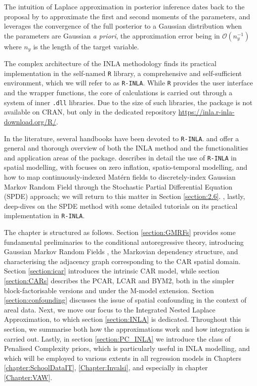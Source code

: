 \documentclass[openany, 11pt, oneside]{book}
\begin{document}
The intuition of Laplace approximation in posterior inference dates back to the proposal by \cite{tierney1986accurate} to approximate the first and second moments of the parameters, and leverages the convergence of the full posterior to a Gaussian distribution when the parameters are Gaussian \textit{a priori}, the approximation error being in $\mathcal{O}(n_y^{-1})$ where $n_y$ is the length of the target variable. 

The complex architecture of the INLA methodology finds its practical implementation in the self-named \texttt{R} library, a comprehensive and self-sufficient environment, which we will refer to as \texttt{R-INLA}. While \texttt{R} provides the user interface and the wrapper functions, the core of calculations is carried out through a system of inner \texttt{.dll} libraries. Due to the size of such libraries, the package is not available on CRAN, but only in the dedicated repository \url{https://inla.r-inla-download.org/R/}.

In the literature, several handbooks have been devoted to \texttt{R-INLA}. \cite{Wang} and \cite{INLAbook} offer a general and thorough overview of both the INLA method and the functionalities and application areas of the package. \cite{Blangiardo} describes in detail the use of \texttt{R-INLA} in spatial modelling, with focuses on zero inflation, spatio-temporal modelling, and how to map continuously-indexed Matérn fields to discretely-index Gaussian Markov Random Field through the Stochastic Partial Differential Equation (SPDE) approach; we will return to this matter in Section \ref{section:2.6}. \cite{INLASPDE}, lastly, deep-dives on the SPDE method with some detailed tutorials on its practical implementation in \texttt{R-INLA}.

The chapter is structured as follows. Section \ref{section:GMRFs} provides some fundamental preliminaries to the conditional autoregressive theory, introducing Gaussian Markov Random Fields \parencite{CAR, GMRFs}, the Markovian dependency structure, and characterising the adjacency graph corresponding to the CAR spatial domain. Section \ref{section:icar} introduces the intrinsic CAR model, while section \ref{section:CARs} describes the PCAR, LCAR and BYM2, both in the simpler block-factorisable versions and under the M-model extension. Section \ref{section:confounding} discusses the issue of spatial confounding in the context of areal data. Next, we move our focus to the Integrated Nested Laplace Approximation, to which section \ref{section:INLA} is dedicated. Throughout this section, we summarise both how the approximations work and how integration is carried out. Lastly, in section \ref{section:PC_INLA} we introduce the class of Penalised Complexity priors, which is particularly useful in INLA modelling, and which will be employed to various extents in all regression models in Chapters \ref{chapter:SchoolDataIT}, \ref{Chapter:Invalsi}, and especially in chapter \ref{Chapter:VAW}.
\end{document}
